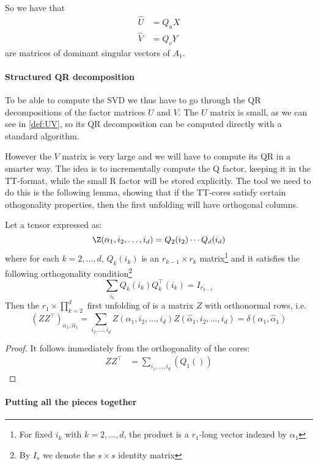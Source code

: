 So we have that
\begin{equation*}
  \begin{split}
    \hat{U} &= Q_u X\\
    \hat{V} &= Q_v Y
  \end{split}
\end{equation*}
are matrices of dominant singular vectors of $A_1$.

\paragraph{Structured QR decomposition}
To be able to compute the SVD we thus have to go through the QR decompositions of the factor matrices $U$ and $V$.
The $U$ matrix is small, as we can see in \ref{def:UV}, so its QR decomposition can be computed directly with a standard algorithm.

However the $V$ matrix is very large and we will have to compute its QR in a smarter way. The idea is to incrementally compute the Q factor, keeping it in the TT-format, while the small R factor will be stored explicitly. The tool we need to do this is the following lemma, showing that if the TT-cores satisfy certain othogonality properties, then the first unfolding will have orthogonal columns.
\begin{Lemma}
  Let a tensor \Z expressed as:
  \begin{equation*}
    \Z(\alpha_1,i_2,\ldots,i_d) = Q_2(i_2) \cdots Q_d(i_d)
  \end{equation*}
  where for each $k = 2,\ldots,d$, $Q_k(i_k)$ is an $r_{k-1} \times r_k$ matrix\footnote{For fixed $i_k$ with $k=2,\ldots,d$, the product is a $r_1$-long vector indexed by $\alpha_1$} and it satisfies the following orthogonality condition\footnote{By $I_s$ we denote the $s \times s$ identity matrix}
  \begin{equation*}
    \sum_{i_k} Q_k(i_k) Q_k^{\top}(i_k) = I_{r_{k-1}}
  \end{equation*}
  Then the $r_1 \times \prod_{k=2}^d$ first unfolding of \Z is a matrix $Z$ with orthonormal rows, i.e.
  \begin{equation*}
    (Z Z^\top)_{\alpha_1,\hat{\alpha}_1} = \sum_{i_2,\ldots,i_d} Z(\alpha_1,i_2,\ldots,i_d) Z(\hat{\alpha}_1,i_2,\ldots,i_d) = \delta(\alpha_1,\hat{\alpha}_1)
  \end{equation*}

  \begin{proof}
    It follows immediately from the orthogonality of the cores:
    \begin{equation*}
      \begin{split}
        ZZ^\top &= \sum_{i_1,\ldots,i_d} (Q_1())
      \end{split}
    \end{equation*}
  \end{proof}
\end{Lemma}

\paragraph{Putting all the pieces together}

